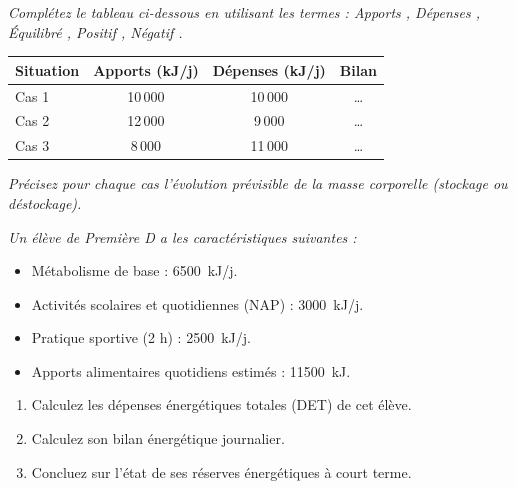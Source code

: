 \documentclass[11pt]{article}
\begin{document}
\begin{exercice}
\emph{Complétez le tableau ci-dessous en utilisant les termes : \og Apports \fg, \og Dépenses \fg, \og Équilibré \fg, \og Positif \fg, \og Négatif \fg.}
\begin{center}
\begin{tabular}{|l|c|c|c|}
\hline
\textbf{Situation} & \textbf{Apports (kJ/j)} & \textbf{Dépenses (kJ/j)} & \textbf{Bilan} \\
\hline
Cas 1 & 10\,000 & 10\,000 & \ldots \\
\hline
Cas 2 & 12\,000 & 9\,000 & \ldots \\
\hline
Cas 3 & 8\,000 & 11\,000 & \ldots \\
\hline
\end{tabular}
\end{center}
\emph{Précisez pour chaque cas l'évolution prévisible de la masse corporelle (stockage ou déstockage).}
\end{exercice}

\begin{exercice}
\emph{Un élève de Première D a les caractéristiques suivantes :}
\begin{itemize}
    \item Métabolisme de base : \SI{6500}{kJ/j}.
    \item Activités scolaires et quotidiennes (NAP) : \SI{3000}{kJ/j}.
    \item Pratique sportive (2 h) : \SI{2500}{kJ/j}.
    \item Apports alimentaires quotidiens estimés : \SI{11500}{kJ}.
\end{itemize}
\begin{enumerate}
    \item Calculez les dépenses énergétiques totales (DET) de cet élève.
    \item Calculez son bilan énergétique journalier.
    \item Concluez sur l'état de ses réserves énergétiques à court terme.
\end{enumerate}
\end{exercice}
\end{document}
